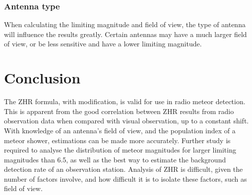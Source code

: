\subsubsection{Antenna type}
When calculating the limiting magnitude and field of view, the type of antenna will influence the results greatly. Certain antennas may have a much larger field of view, or be less sensitive and have a lower limiting magnitude. 
\section{Conclusion}
The ZHR formula, with modification, is valid for use in radio meteor detection. This is apparent from the good correlation between ZHR results from radio observation data when compared with visual observation, up to a constant shift. With knowledge of an antenna's field of view, and the population index of a meteor shower, estimations can be made more accurately. Further study is required to analyse the distribution of meteor magnitudes for larger limiting magnitudes than 6.5, as well as the best way to estimate the background detection rate of an observation station. Analysis of ZHR is difficult, given the number of factors involve, and how difficult it is to isolate these factors, such as field of view.